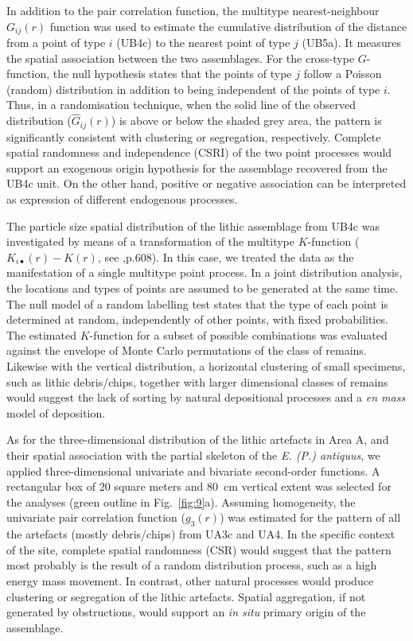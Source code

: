 \documentclass[preprint,authoryear,times]{elsarticle} %
\begin{document}
In addition to the pair correlation function, the multitype nearest-neighbour $G_{ij}(r)$ function was used to estimate the cumulative distribution of the distance from a point of type $i$ (UB4c) to the nearest point of type $j$ (UB5a). It measures the spatial association between the two assemblages. For the cross-type $G$-function, the null hypothesis states that the points of type $j$ follow a Poisson (random) distribution in addition to being independent of the points of type $i$. Thus, in a randomisation technique, when the solid line of the observed distribution ($\hat{G}_{ij}(r)$) is above or below the shaded grey area, the pattern is significantly consistent with clustering or segregation, respectively. Complete spatial randomness and independence (CSRI) of the two point processes would support an exogenous origin hypothesis for the assemblage recovered from the UB4c unit. On the other hand, positive or negative association can be interpreted as expression of different endogenous processes.

The particle size spatial distribution of the lithic assemblage from UB4c was investigated by means of a transformation of the multitype $K$-function ($K_{i\bullet}(r)-K(r)$, see \cite{spatstatBook},p.608). In this case, we treated the data as the manifestation of a single multitype point process. In a joint distribution analysis, the locations and types of points are assumed to be generated at the same time. The null model of a random labelling test states that the type of each point is determined at random, independently of other points, with fixed probabilities. The estimated $K$-function for a subset of possible combinations was evaluated against the envelope of Monte Carlo permutations of the class of remains. Likewise with the vertical distribution, a horizontal clustering of small specimens, such as lithic debris/chips, together with larger dimensional classes of remains would suggest the lack of sorting by natural depositional processes and a \emph{en mass} model of deposition.

As for the three-dimensional distribution of the lithic artefacts in Area A, and their spatial association with the partial skeleton of the \emph{E. (P.) antiquus}, we applied three-dimensional univariate and bivariate second-order functions. A rectangular box of 20 square meters and 80~cm vertical extent was selected for the analyses (green outline in Fig.~\ref{fig:9}a). Assuming homogeneity, the univariate pair correlation function ($g_3(r)$) was estimated for the pattern of all the artefacts (mostly debris/chips) from UA3c and UA4. In the specific context of the site, complete spatial randomness (CSR) would suggest that the pattern most probably is the result of a random distribution process, such as a high energy mass movement. In contrast, other natural processes would produce clustering or segregation of the lithic artefacts. Spatial aggregation, if not generated by obstructions, would support an \emph{in situ} primary origin of the assemblage.
\end{document}
